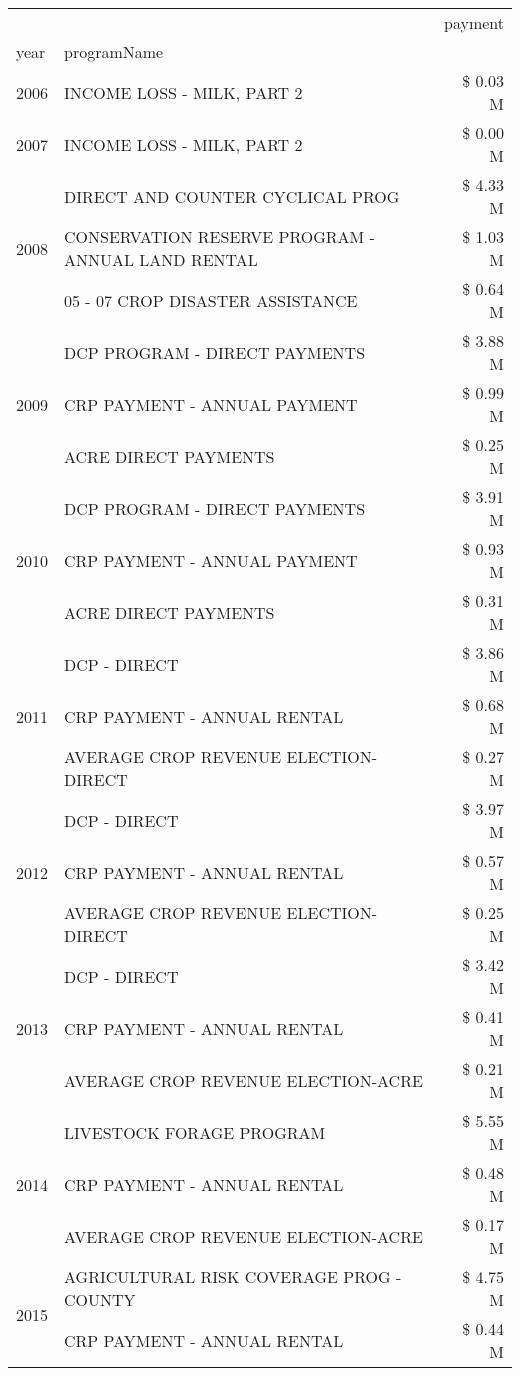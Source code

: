 \begin{tabular}{llr}
\toprule
 &  & payment \\
year & programName &  \\
\midrule
2006 & INCOME LOSS - MILK, PART 2 & \$ 0.03 M \\
\cline{1-3}
2007 & INCOME LOSS - MILK, PART 2 & \$ 0.00 M \\
\cline{1-3}
\multirow[t]{3}{*}{2008} & DIRECT AND COUNTER CYCLICAL PROG & \$ 4.33 M \\
 & CONSERVATION RESERVE PROGRAM - ANNUAL LAND RENTAL & \$ 1.03 M \\
 & 05 - 07 CROP DISASTER ASSISTANCE & \$ 0.64 M \\
\cline{1-3}
\multirow[t]{3}{*}{2009} & DCP PROGRAM - DIRECT PAYMENTS & \$ 3.88 M \\
 & CRP PAYMENT - ANNUAL PAYMENT & \$ 0.99 M \\
 & ACRE DIRECT PAYMENTS & \$ 0.25 M \\
\cline{1-3}
\multirow[t]{3}{*}{2010} & DCP PROGRAM - DIRECT PAYMENTS & \$ 3.91 M \\
 & CRP PAYMENT - ANNUAL PAYMENT & \$ 0.93 M \\
 & ACRE DIRECT PAYMENTS & \$ 0.31 M \\
\cline{1-3}
\multirow[t]{3}{*}{2011} & DCP - DIRECT & \$ 3.86 M \\
 & CRP PAYMENT - ANNUAL RENTAL & \$ 0.68 M \\
 & AVERAGE CROP REVENUE ELECTION-DIRECT & \$ 0.27 M \\
\cline{1-3}
\multirow[t]{3}{*}{2012} & DCP - DIRECT & \$ 3.97 M \\
 & CRP PAYMENT - ANNUAL RENTAL & \$ 0.57 M \\
 & AVERAGE CROP REVENUE ELECTION-DIRECT & \$ 0.25 M \\
\cline{1-3}
\multirow[t]{3}{*}{2013} & DCP - DIRECT & \$ 3.42 M \\
 & CRP PAYMENT - ANNUAL RENTAL & \$ 0.41 M \\
 & AVERAGE CROP REVENUE ELECTION-ACRE & \$ 0.21 M \\
\cline{1-3}
\multirow[t]{3}{*}{2014} & LIVESTOCK FORAGE PROGRAM & \$ 5.55 M \\
 & CRP PAYMENT - ANNUAL RENTAL & \$ 0.48 M \\
 & AVERAGE CROP REVENUE ELECTION-ACRE & \$ 0.17 M \\
\cline{1-3}
\multirow[t]{3}{*}{2015} & AGRICULTURAL RISK COVERAGE PROG - COUNTY & \$ 4.75 M \\
 & CRP PAYMENT - ANNUAL RENTAL & \$ 0.44 M \\

\end{tabular}
